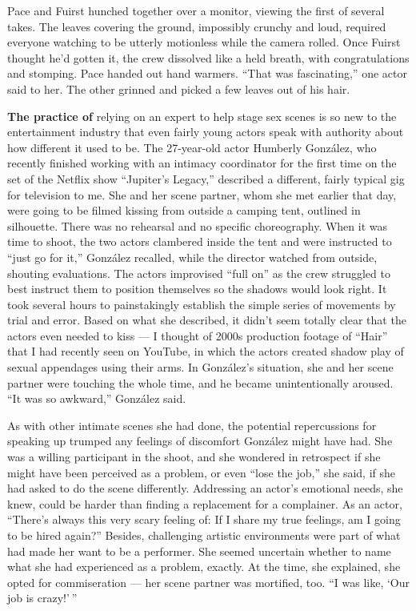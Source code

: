 Pace and Fuirst hunched together over a monitor, viewing the first of
several takes. The leaves covering the ground, impossibly crunchy and
loud, required everyone watching to be utterly motionless while the
camera rolled. Once Fuirst thought he'd gotten it, the crew dissolved
like a held breath, with congratulations and stomping. Pace handed out
hand warmers. ``That was fascinating,'' one actor said to her. The other
grinned and picked a few leaves out of his hair.

\textbf{The practice of} relying on an expert to help stage sex scenes
is so new to the entertainment industry that even fairly young actors
speak with authority about how different it used to be. The 27-year-old
actor Humberly González, who recently finished working with an intimacy
coordinator for the first time on the set of the Netflix show
``Jupiter's Legacy,'' described a different, fairly typical gig for
television to me. She and her scene partner, whom she met earlier that
day, were going to be filmed kissing from outside a camping tent,
outlined in silhouette. There was no rehearsal and no specific
choreography. When it was time to shoot, the two actors clambered inside
the tent and were instructed to ``just go for it,'' González recalled,
while the director watched from outside, shouting evaluations. The
actors improvised ``full on'' as the crew struggled to best instruct
them to position themselves so the shadows would look right. It took
several hours to painstakingly establish the simple series of movements
by trial and error. Based on what she described, it didn't seem totally
clear that the actors even needed to kiss --- I thought of 2000s
production footage of ``Hair'' that I had recently seen on YouTube, in
which the actors created shadow play of sexual appendages using their
arms. In González's situation, she and her scene partner were touching
the whole time, and he became unintentionally aroused. ``It was so
awkward,'' González said.

As with other intimate scenes she had done, the potential repercussions
for speaking up trumped any feelings of discomfort González might have
had. She was a willing participant in the shoot, and she wondered in
retrospect if she might have been perceived as a problem, or even ``lose
the job,'' she said, if she had asked to do the scene differently.
Addressing an actor's emotional needs, she knew, could be harder than
finding a replacement for a complainer. As an actor, ``There's always
this very scary feeling of: If I share my true feelings, am I going to
be hired again?'' Besides, challenging artistic environments were part
of what had made her want to be a performer. She seemed uncertain
whether to name what she had experienced as a problem, exactly. At the
time, she explained, she opted for commiseration --- her scene partner
was mortified, too. ``I was like, `Our job is crazy!' ''

